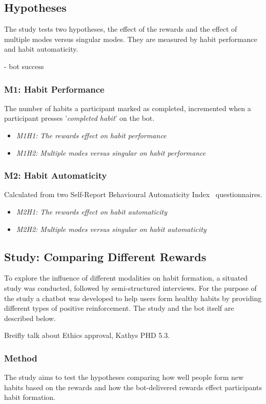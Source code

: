 \subsection{Hypotheses}
The study tests two hypotheses, the effect of the rewards and the effect of multiple modes versus singular modes. They are measured by habit performance and habit automaticity.

- bot success


\subsubsection{M1: Habit Performance}
The number of habits a participant marked as completed, incremented when a participant presses '\textit{completed habit}' on the bot.

\begin{itemize}
  \item \textit{M1H1: The rewards effect on habit performance}
  \item \textit{M1H2: Multiple modes versus singular on habit performance}
\end{itemize}

\subsubsection{M2: Habit Automaticity}
Calculated from two Self-Report Behavioural Automaticity Index~\cite{article_4q_SRBAI} questionnaires.
\begin{itemize}
\item \textit{M2H1: The rewards effect on habit automaticity}
\item \textit{M2H2: Multiple modes versus singular on habit automaticity}
\end{itemize}

\subsection{Study: Comparing Different Rewards}
To explore the influence of different modalities on habit formation, a situated study was conducted, followed by semi-structured interviews. For the purpose of the study a chatbot was developed to help users form healthy habits by providing different types of positive reinforcement. The study and the bot itself are described below.

Breifly talk about Ethics approval, Kathys PHD 5.3.\newline

\subsubsection{Method}
The study aims to test the hypotheses comparing how well people form new habits based on the rewards and how the bot-delivered rewards effect participants habit formation.


